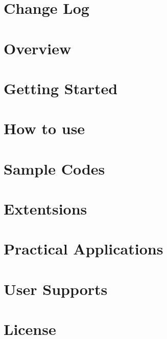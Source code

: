 \documentclass[12pt,a4paper,dvipdfmx]{article} %
\title{\docTitle}
\author{Daisuke Namekata}
\author{Masaki Iwasawa}
\author{Keigo Nitadori}
\author{Ataru Tanikawa}
\author{Takayuki Muranushi}
\author{Long Wang}
\author{Natsuki Hosono}
\author{Jun-ichiro Makino}
\affil{\affiliation}
\date{}
\begin{document}
\maketitle
\tableofcontents
\clearpage

\section{Change Log}
\label{sec:changelog}

\clearpage

\section{Overview}
\label{sec:overivew}

\clearpage

\section{Getting Started}
\label{sec:getting_started}

\clearpage

\section{How to use}
\label{sec:how_to_use}

\clearpage

\section{Sample Codes}
\label{sec:samplecode}

\clearpage

\section{Extentsions}
\label{sec:extension}

\clearpage

\section{Practical Applications}
\label{sec:applications}

\clearpage

\section{User Supports}
\label{sec:usersupport}

\clearpage

\section{License}
\label{sec:license}

\end{document}
